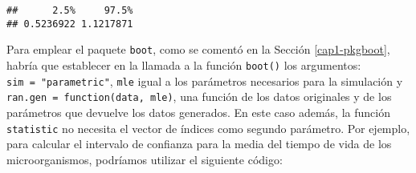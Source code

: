 \documentclass[
]{book}
\newenvironment{Shaded}{\begin{snugshade}}{\end{snugshade}}
\newcommand{\CommentTok}[1]{\textcolor[rgb]{0.56,0.35,0.01}{\textit{#1}}}
\newcommand{\DecValTok}[1]{\textcolor[rgb]{0.00,0.00,0.81}{#1}}
\newcommand{\KeywordTok}[1]{\textcolor[rgb]{0.13,0.29,0.53}{\textbf{#1}}}
\newcommand{\NormalTok}[1]{#1}
\newcommand{\OperatorTok}[1]{\textcolor[rgb]{0.81,0.36,0.00}{\textbf{#1}}}
\newcommand{\StringTok}[1]{\textcolor[rgb]{0.31,0.60,0.02}{#1}}
\theoremstyle{definition}
\theoremstyle{definition}
\theoremstyle{definition}
\theoremstyle{remark}
\begin{document}
\begin{Shaded}
\end{Shaded}

\begin{verbatim}
##      2.5%     97.5% 
## 0.5236922 1.1217871
\end{verbatim}

Para emplear el paquete \texttt{boot}, como se comentó en la Sección
\ref{cap1-pkgboot}, habría que establecer en la llamada a la
función \texttt{boot()} los argumentos: \texttt{sim\ =\ "parametric"},
\texttt{mle} igual a los parámetros necesarios para la simulación y
\texttt{ran.gen\ =\ function(data,\ mle)}, una función de los datos originales
y de los parámetros que devuelve los datos generados.
En este caso además, la función \texttt{statistic} no necesita el vector
de índices como segundo parámetro.
Por ejemplo, para calcular el intervalo de confianza para la media del
tiempo de vida de los microorganismos, podríamos utilizar el siguiente código:
\end{document}
